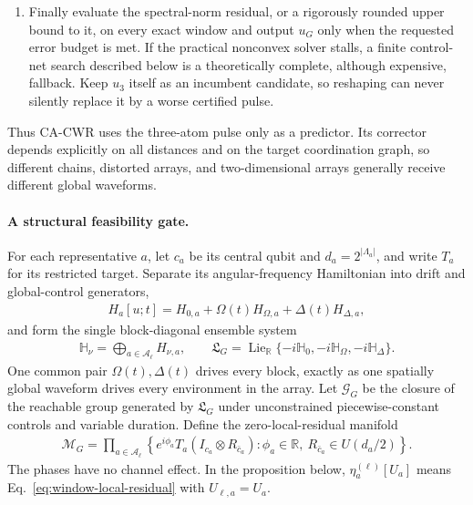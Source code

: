 \begin{enumerate}
\begin{align}
\end{align}
to solve a shared trust-region minimax correction.  Add the five-site bulk
cone first, then the physical buffer and the remaining configuration classes.
Accept a correction only after exact window rollouts reduce the certified
maximum residual.
\item Finally evaluate the spectral-norm residual, or a rigorously rounded
upper bound to it, on every exact window and output $u_G$ only when the
requested error budget is met.  If the practical
nonconvex solver stalls, a finite control-net search described below is a
theoretically complete, although expensive, fallback.  Keep $u_3$ itself as
an incumbent candidate, so reshaping can never silently replace it by a worse
certified pulse.
\end{enumerate}
Thus CA-CWR uses the three-atom pulse only as a predictor.  Its corrector
depends explicitly on all distances and on the target coordination graph, so
different chains, distorted arrays, and two-dimensional arrays generally
receive different global waveforms.

\paragraph{A structural feasibility gate.}
For each representative $a$, let $c_a$ be its central qubit and
$d_a=2^{|\Lambda_a|}$, and write $T_a$ for its restricted target.  Separate
its angular-frequency Hamiltonian into drift and global-control generators,
\begin{align}
H_a[u;t]=H_{0,a}+\Omega(t)H_{\Omega,a}
+\Delta(t)H_{\Delta,a},
\end{align}
and form the single block-diagonal ensemble system
\begin{align}
\mathbb H_\nu=\bigoplus_{a\in\mathcal A_\ell}H_{\nu,a},
\qquad
\mathfrak L_G
=\operatorname{Lie}_{\mathbb R}
\{-i\mathbb H_0,-i\mathbb H_\Omega,-i\mathbb H_\Delta\}.
\label{eq:configuration-ensemble-lie-algebra}
\end{align}
One common pair $\Omega(t),\Delta(t)$ drives every block, exactly as one
spatially global waveform drives every environment in the array.  Let
$\mathscr G_G$ be the closure of the reachable group generated by
$\mathfrak L_G$ under unconstrained piecewise-constant controls and variable
duration.  Define the zero-local-residual manifold
\begin{align}
\mathscr M_G
=\prod_{a\in\mathcal A_\ell}
\left\{
e^{i\phi_a}T_a
\left(I_{c_a}\otimes R_{\bar c_a}\right):
\phi_a\in\mathbb R,\ R_{\bar c_a}\in U(d_a/2)
\right\}.
\label{eq:zero-local-residual-manifold}
\end{align}
The phases have no channel effect.  In the proposition below,
$\eta_a^{(\ell)}[U_a]$ means
Eq.~\eqref{eq:window-local-residual} with $U_{\ell,a}=U_a$.

